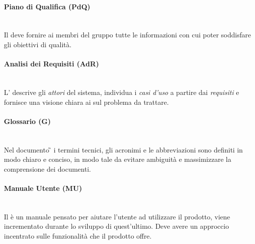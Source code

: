 	\paragraph{Piano di Qualifica (PdQ)} 
	~\\Il \PdQ{} deve fornire ai membri del gruppo tutte le informazioni con cui poter soddisfare gli obiettivi di qualità.
	\paragraph{Analisi dei Requisiti (AdR)}
	~\\L'\AdR{} descrive gli \emph{attori} del sistema, individua i \emph{casi d'uso} a partire dai \emph{requisiti} e fornisce una visione chiara ai \progs{} sul problema da trattare.
	
	\begin{comment}
	\paragraph{Specifica Tecnica (ST)}
	~\\La \ST{} si occupa di dare una descrizione ad alto livello del prodotto, descrivendo pregi e difetti delle sue tecnologie. \textcolor{red}{Da ampliare quando avremo fatto il documento}
	\paragraph{Definizione di Prodotto (DdP)}
	~\\La \DdP{} descrive i dettagli implementativi del prodotto, andando a definire anche le funzioni delle componenti terminali del sistema tramite diagrammi \emph{UML}.
	\end{comment}
	
	\paragraph{Glossario (G)}
	~\\Nel documento \G{} i termini tecnici, gli acronimi e le abbreviazioni sono definiti in modo chiaro e conciso, in modo tale da evitare ambiguità e massimizzare la comprensione dei documenti.
	\paragraph{Manuale Utente (MU)}
	~\\Il \MU{} è un manuale pensato per aiutare l'utente ad utilizzare il prodotto, viene incrementato durante lo sviluppo di quest'ultimo. Deve avere un approccio incentrato sulle funzionalità che il prodotto offre.
